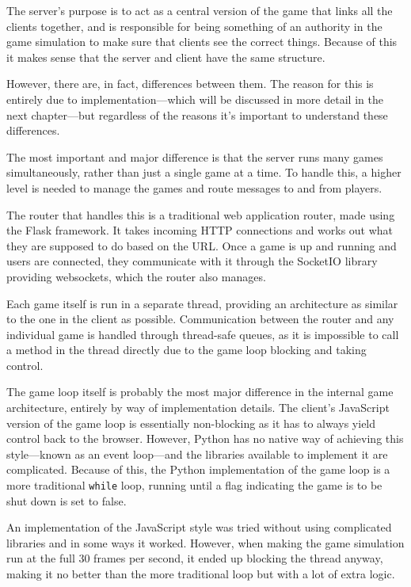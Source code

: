 The server's purpose is to act as a central version of the game that links all the clients together, and is responsible for being something of an authority in the game simulation to make sure that clients see the correct things. Because of this it makes sense that the server and client have the same structure.

However, there are, in fact, differences between them. The reason for this is entirely due to implementation---which will be discussed in more detail in the next chapter---but regardless of the reasons it's important to understand these differences.

The most important and major difference is that the server runs many games simultaneously, rather than just a single game at a time. To handle this, a higher level is needed to manage the games and route messages to and from players.

The router that handles this is a traditional web application router, made using the Flask framework. It takes incoming HTTP connections and works out what they are supposed to do based on the URL. Once a game is up and running and users are connected, they communicate with it through the SocketIO library providing websockets, which the router also manages.

Each game itself is run in a separate thread, providing an architecture as similar to the one in the client as possible. Communication between the router and any individual game is handled through thread-safe queues, as it is impossible to call a method in the thread directly due to the game loop blocking and taking control.

The game loop itself is probably the most major difference in the internal game architecture, entirely by way of implementation details. The client's JavaScript version of the game loop is essentially non-blocking as it has to always yield control back to the browser. However, Python has no native way of achieving this style---known as an event loop---and the libraries available to implement it are complicated. Because of this, the Python implementation of the game loop is a more traditional \texttt{while} loop, running until a flag indicating the game is to be shut down is set to false.

An implementation of the JavaScript style was tried without using complicated libraries and in some ways it worked. However, when making the game simulation run at the full 30 frames per second, it ended up blocking the thread anyway, making it no better than the more traditional loop but with a lot of extra logic.

